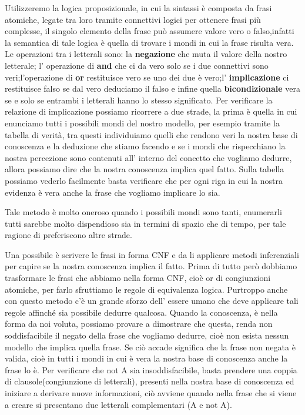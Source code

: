 		Utilizzeremo la logica proposizionale, in cui la sintassi è composta da frasi atomiche, legate tra loro tramite connettivi logici per ottenere frasi più complesse, il singolo elemento della frase può assumere valore vero o falso,infatti la semantica di tale logica è quella di trovare i mondi in cui la frase risulta vera. Le operazioni tra i letterali sono: la \textbf{negazione} che muta il valore della nostro letterale; l' operazione di \textbf{and} che ci da vero solo se i due connettivi sono veri;l'operazione di \textbf{or} restituisce vero se uno dei due è vero;l' \textbf{implicazione} ci restituisce falso se dal vero deduciamo il falso e infine quella \textbf{bicondizionale} vera se e solo se entrambi i letterali hanno lo stesso significato.
		Per verificare la relazione di implicazione possiamo ricorrere a due strade, la prima è quella in cui enunciamo tutti i possibili mondi del nostro modello, per esempio tramite la tabella di verità, tra questi individuiamo quelli che rendono veri la nostra base di conoscenza e la deduzione che stiamo facendo e se i mondi che rispecchiano la nostra percezione sono contenuti all' interno del concetto che vogliamo dedurre, allora possiamo dire che la nostra conoscenza implica quel fatto.
		Sulla tabella possiamo vederlo facilmente basta verificare che per ogni riga in cui la nostra evidenza è vera anche la frase che vogliamo implicare lo sia.
		\par
		Tale metodo è molto oneroso quando i possibili mondi sono tanti, enumerarli tutti sarebbe molto dispendioso sia in termini di spazio che di tempo, per tale ragione di preferiscono altre strade.
		\par
		Una possibile è scrivere le frasi in forma CNF e da li applicare metodi inferenziali per capire se la nostra conoscenza implica il fatto. 
		Prima di tutto però dobbiamo trasformare le frasi che abbiamo nella forma CNF, cioè or di congiunzioni atomiche, per farlo sfruttiamo le regole di equivalenza logica. Purtroppo anche con questo metodo c'è un grande sforzo dell' essere umano che deve applicare tali regole affinché sia possibile dedurre qualcosa.
		Quando la conoscenza, è nella forma da noi voluta, possiamo provare a dimostrare che questa, renda non soddisfacibile il negato della frase che vogliamo dedurre, cioè non esista nessun modello che implica quella frase. Se ciò accade significa che la frase non negata è valida, cioè in tutti i mondi in cui è vera la nostra base di conoscenza anche la frase lo è. Per verificare che not A sia insoddisfacibile, basta prendere una coppia di clausole(congiunzione di letterali), presenti nella nostra base di conoscenza ed iniziare a derivare nuove informazioni, ciò avviene quando nella frase che si viene a creare si presentano due letterali complementari (A e not A).
